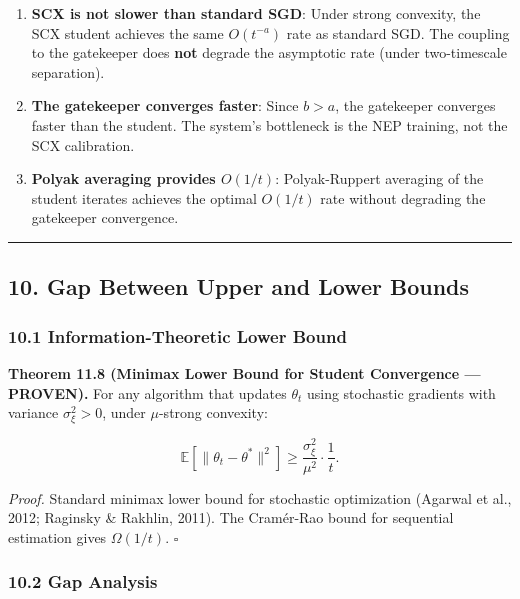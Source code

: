 \documentclass[
  12pt,
]{article}
\begin{document}
\begin{enumerate}
\def\labelenumi{\arabic{enumi}.}
\item
  \textbf{SCX is not slower than standard SGD}: Under strong convexity,
  the SCX student achieves the same \(O(t^{-a})\) rate as standard SGD.
  The coupling to the gatekeeper does \textbf{not} degrade the
  asymptotic rate (under two-timescale separation).
\item
  \textbf{The gatekeeper converges faster}: Since \(b > a\), the
  gatekeeper converges faster than the student. The system's bottleneck
  is the NEP training, not the SCX calibration.
\item
  \textbf{Polyak averaging provides \(O(1/t)\)}: Polyak-Ruppert
  averaging of the student iterates achieves the optimal \(O(1/t)\) rate
  without degrading the gatekeeper convergence.
\end{enumerate}

\begin{center}\rule{0.5\linewidth}{0.5pt}\end{center}

\subsection{10. Gap Between Upper and Lower
Bounds}\label{gap-between-upper-and-lower-bounds}

\subsubsection{10.1 Information-Theoretic Lower
Bound}\label{information-theoretic-lower-bound}

\textbf{Theorem 11.8 (Minimax Lower Bound for Student Convergence ---
PROVEN).} For any algorithm that updates \(\theta_t\) using stochastic
gradients with variance \(\sigma_\xi^2 > 0\), under \(\mu\)-strong
convexity:

\[\mathbb{E}[\|\theta_t - \theta^*\|^2] \geq \frac{\sigma_\xi^2}{\mu^2} \cdot \frac{1}{t}.\]

\emph{Proof.} Standard minimax lower bound for stochastic optimization
(Agarwal et al., 2012; Raginsky \& Rakhlin, 2011). The Cramér-Rao bound
for sequential estimation gives \(\Omega(1/t)\). \(\square\)

\subsubsection{10.2 Gap Analysis}\label{gap-analysis}
\end{document}
